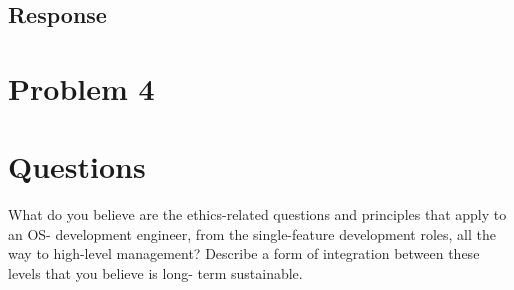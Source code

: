 \documentclass{assignment-x}
\begin{document}
\subsection{Response}


\section{Problem 4}
\section{Questions}
What do you believe are the ethics-related questions and principles that apply to an OS-
development engineer, from the single-feature development roles, all the way to high-level
management? Describe a form of integration between these levels that you believe is long-
term sustainable.
\end{document}
